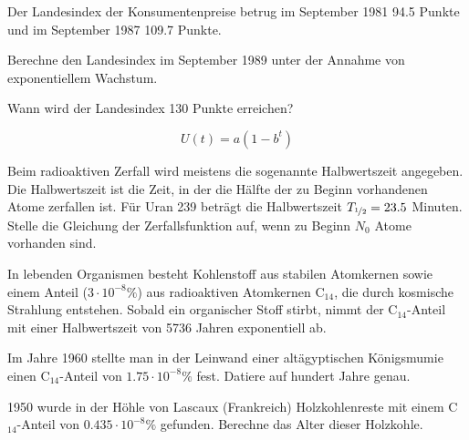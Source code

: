 \documentclass[%
11pt,%
twoside,%
titlepage,%
german,%
headsepline%
]{scrartcl}
\begin{document}
\begin{ueb}[Konsum]
Der Landesindex der Konsumentenpreise betrug im September 1981 94.5 Punkte und im September 1987 109.7 Punkte.
\begin{enumeratea}
\item Berechne den Landesindex im September 1989
unter der Annahme von exponentiellem Wachstum.
\item Wann wird der Landesindex 130 Punkte erreichen?
\end{enumeratea}
\end{ueb}

$$U(t) = a(1 - b^t)$$

\begin{ueb}[Zerfall]
Beim radioaktiven Zerfall wird meistens die sogenannte Halbwertszeit angegeben. Die Halbwertszeit ist die Zeit, in der die Hälfte der zu Beginn vorhandenen Atome zerfallen ist.
Für Uran 239 beträgt die Halbwertszeit $T_{\nicefrac{1}{2}}=23.5$
Minuten. Stelle die Gleichung der Zerfallsfunktion auf, wenn zu Beginn $N_0$ Atome vorhanden sind.
\end{ueb}

\begin{ueb}[Altersbestimmung]
In lebenden Organismen besteht Kohlenstoff aus stabilen Atomkernen sowie einem Anteil ($3\cdot10^{-8}\%$) aus radioaktiven Atomkernen C$_{14}$, die durch kosmische Strahlung entstehen. Sobald ein organischer Stoff stirbt, nimmt der C$_{14}$-Anteil mit einer Halbwertszeit von 5736 Jahren exponentiell ab.
\begin{enumeratea}
\item Im Jahre 1960 stellte man in der Leinwand einer altägyptischen Königsmumie einen C$_{14}$-Anteil von $1.75\cdot10^{-8}\%$ fest. Datiere auf hundert Jahre genau.
\item 1950 wurde in der Höhle von Lascaux (Frankreich) Holzkohlenreste mit einem C$_{14}$-Anteil von $0.435\cdot10^{-8}\%$ gefunden. Berechne das Alter dieser Holzkohle.
\end{enumeratea}
\end{ueb}
\end{document}
